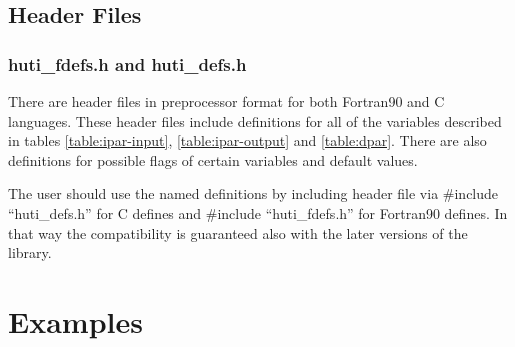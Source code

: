\documentclass[11pt,a4paper,english,oneside]{report}
\begin{document}

\section{Header Files}
\subsection{{\ttfamily huti\_fdefs.h} and {\ttfamily huti\_defs.h}}

There are header files in preprocessor format for both Fortran90 and C
languages. These header files include definitions for all of the
variables described in
tables \ref{table:ipar-input}, \ref{table:ipar-output} and \ref{table:dpar}.
There are also definitions for possible flags of certain variables and
default values.

The user should use the named definitions by including header file
via {\ttfamily \#include ``huti\_defs.h''} for C defines and 
{\ttfamily \#include ``huti\_fdefs.h''} for Fortran90 defines. In that
way the compatibility is guaranteed also with the later versions of
the library.


\chapter{Examples}
\label{ch:examples}


\end{document}
